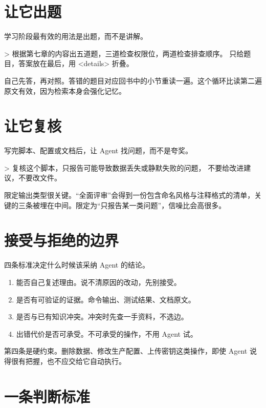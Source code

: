 \section{让它出题}

学习阶段最有效的用法是出题，而不是讲解。

\begin{shellsession}
> 根据第七章的内容出五道题，三道检查权限位，两道检查排查顺序。
  只给题目，答案放在最后，用 <details> 折叠。
\end{shellsession}

自己先答，再对照。答错的题目对应回书中的小节重读一遍。这个循环比读第二遍原文有效，因为检索本身会强化记忆。

\section{让它复核}

写完脚本、配置或文档后，让 Agent 找问题，而不是夸奖。

\begin{shellsession}
> 复核这个脚本，只报告可能导致数据丢失或静默失败的问题，
  不要给改进建议，不要改文件。
\end{shellsession}

限定输出类型很关键。“全面评审”会得到一份包含命名风格与注释格式的清单，关键的三条被埋在中间。限定为“只报告某一类问题”，信噪比会高很多。

\section{接受与拒绝的边界}

四条标准决定什么时候该采纳 Agent 的结论。

\begin{enumerate}
  \item 能否自己复述理由。说不清原因的改动，先别接受。
  \item 是否有可验证的证据。命令输出、测试结果、文档原文。
  \item 是否与已有知识冲突。冲突时先查一手资料，不选边。
  \item 出错代价是否可承受。不可承受的操作，不用 Agent 试。
\end{enumerate}

第四条是硬约束。删除数据、修改生产配置、上传密钥这类操作，即使 Agent 说得很有把握，也不应交给它自动执行。

\section{一条判断标准}

